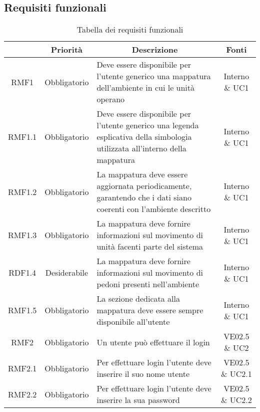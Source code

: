 \vspace{0.5cm}

\subsection{Requisiti funzionali}

	\newcommand*{\thead}[1]{\multicolumn{1}{c}{\bfseries #1}}	
	\setlength{\tabcolsep}{10pt}
	\begin{longtable}[h!] { c c m{8cm} c}
		\caption{Tabella dei requisiti funzionali} \\
		\rowcolor{lightgray}
		\thead{Requisito} & \thead{Priorità} & \thead{Descrizione} & \thead{Fonti} \\ \endhead%
		
		RMF1 & Obbligatorio & Deve essere disponibile per l'utente generico una mappatura dell'ambiente in cui le unità operano & Interno \& UC1 \\
		
		RMF1.1 & Obbligatorio & Deve essere disponibile per l'utente generico una legenda esplicativa della simbologia utilizzata all'interno della mappatura & Interno \& UC1 \\
		
		RMF1.2 & Obbligatorio & La mappatura deve essere aggiornata periodicamente, garantendo che i dati siano coerenti con l'ambiente descritto & Interno \& UC1 \\
		
		RMF1.3 & Obbligatorio & La mappatura deve fornire informazioni sul movimento di unità facenti parte del sistema & Interno \& UC1 \\
		
		RDF1.4 & Desiderabile & La mappatura deve fornire informazioni sul movimento di pedoni presenti nell'ambiente & Interno \& UC1 \\
		
		RMF1.5 & Obbligatorio & La sezione dedicata alla mappatura deve essere sempre disponibile all'utente & Interno \& UC1 \\
		
		RMF2 & Obbligatorio & Un utente può effettuare il login & VE02.5 \& UC2 \\
		
		RMF2.1 & Obbligatorio & Per effettuare login l'utente deve inserire il suo nome utente & VE02.5 \& UC2.1 \\
		
		RMF2.2 & Obbligatorio & Per effettuare login l'utente deve inserire la sua password & VE02.5 \& UC2.2 \\
		

\end{longtable}

